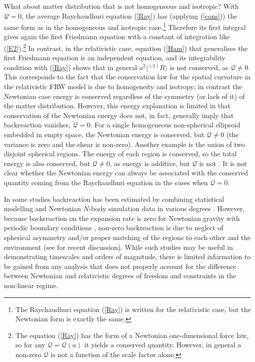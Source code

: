 \documentclass[11pt, a4paper]{article}
\newcommand{\re}[1]{(\ref{#1})}
\newcommand{\av}[1]{\langle{#1}\rangle}
\newcommand{\sQ}{\mathcal{Q}}
\newcommand{\sR}{{^{(3)}R}}
\begin{document}
What about matter distribution that is not homogeneous and isotropic? With $\sQ=0$, the average Raychaudhuri equation \re{Ray} has (applying \re{cons}) the same form as in the homogeneous and isotropic case.\footnote{The Raychaudhuri equation \re{Ray} is written for the relativistic case, but the Newtonian form is exactly the same.} Therefore its first integral gives again the first Friedmann equation with a constant of integration like \re{E2}.\footnote{The equation \re{Ray}  has the form of a Newtonian one-dimensional force law, so for any $\sQ=\sQ(a)$ it yields a conserved quantity. However, in general a non-zero $\sQ$ is not a function of the scale factor alone.}
In contrast, in the relativistic case, equation \re{Ham} that generalises the first Friedmann equation is an independent equation, and its integrability condition with \re{Ray} shows that in general $a^2 \av{\sR}$ is not conserved, as $\sQ\neq0$. This corresponds to the fact that the conservation law for the spatial curvature in the relativistic FRW model is due to homogeneity and isotropy; in contrast the Newtonian case energy is conserved regardless of the symmetry (or lack of it) of the matter distribution.
However, this energy explanation is limited in that conservation of the Newtonian energy does not, in fact, generally imply that backreaction vanishes, $\sQ=0$. For a single homogeneous non-spherical ellipsoid embedded in empty space, the Newtonian energy is conserved, but $\sQ\neq0$ (the variance is zero and the shear is non-zero). Another example is the union of two disjoint spherical regions. The energy of each region is conserved, so the total energy is also conserved, but $\sQ\neq0$, as energy is additive, but $\sQ$ is not \cite{Rasanen:2006zw, Rasanen:2006kp}. It is not clear whether the Newtonian energy can always be associated with the conserved quantity coming from the Raychaudhuri equation in the cases when $\sQ=0$.

In some studies backreaction has been estimated by combining statistical modelling and Newtonian $N$-body simulation data in various degrees \cite{Wiegand:2010uh, *Wiegand:2011gs, *Roukema:2013cya, *Racz:2016rss, *Roukema:2017doi}. However, because backreaction on the expansion rate is zero for Newtonian gravity with periodic boundary conditions \cite{Buchert:1995fz}, non-zero backreaction is due to neglect of spherical asymmetry and/or proper matching of the regions to each other and the environment (see \cite{Kaiser:2017hqn, Buchert:2017obp} for recent discussion). While such studies may be useful in demonstrating timescales and orders of magnitude, there is limited information to be gained from any analysis that does not properly account for the difference between Newtonian and relativistic degrees of freedom and constraints in the non-linear regime.
\end{document}
